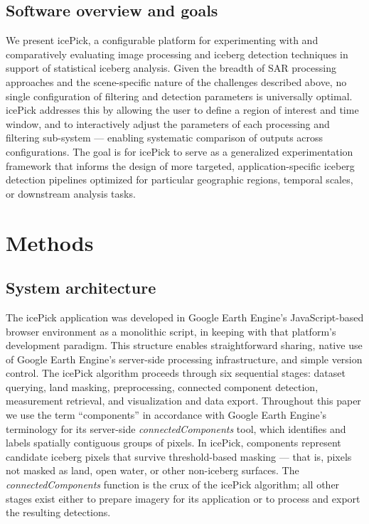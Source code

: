 \documentclass[11pt, letterpaper]{article}
\begin{document}
\subsection{Software overview and goals}

We present icePick, a configurable platform for experimenting with and comparatively evaluating image processing and iceberg detection techniques in support of statistical iceberg analysis. Given the breadth of SAR processing approaches and the scene-specific nature of the challenges described above, no single configuration of filtering and detection parameters is universally optimal. icePick addresses this by allowing the user to define a region of interest and time window, and to interactively adjust the parameters of each processing and filtering sub-system --- enabling systematic comparison of outputs across configurations. The goal is for icePick to serve as a generalized experimentation framework that informs the design of more targeted, application-specific iceberg detection pipelines optimized for particular
geographic regions, temporal scales, or downstream analysis tasks.

\section{Methods}

\subsection{System architecture}

The icePick application was developed in Google Earth Engine's JavaScript-based browser environment as a monolithic script, in keeping with that platform's development paradigm. This structure enables straightforward sharing, native use of Google Earth Engine's server-side processing infrastructure, and simple version control. The icePick algorithm proceeds through six sequential stages: dataset
querying, land masking, preprocessing, connected component detection, measurement retrieval, and visualization and data export. Throughout this paper we use the term ``components'' in accordance with Google Earth Engine's terminology for its server-side \textit{connectedComponents} tool, which identifies and labels spatially contiguous groups of pixels. In icePick, components represent candidate iceberg pixels that survive threshold-based masking --- that is, pixels not masked as land, open water, or other non-iceberg surfaces. The \textit{connectedComponents} function is the crux of the icePick algorithm; all other stages exist either to prepare imagery for its application or to process and export the resulting detections.
\end{document}

